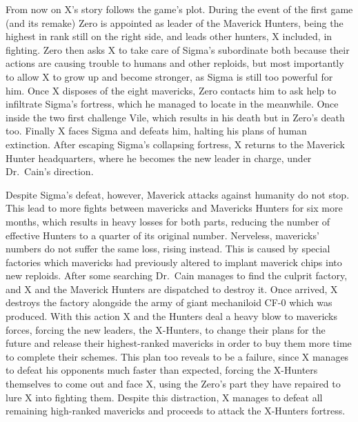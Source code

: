 From now on X's story follows the game's plot. During the event of the first game (and its remake) Zero is appointed as leader of the Maverick Hunters, being the highest in rank still on the right side, and leads other hunters, X included, in fighting. Zero then asks  X to take care of Sigma's subordinate both because their actions are causing trouble to humans and other reploids, but most importantly to allow X to grow up and become stronger, as Sigma is still too powerful for him. Once X disposes of the eight mavericks, Zero contacts him to ask help to infiltrate Sigma's fortress, which he managed to locate in the meanwhile. Once inside the two first challenge Vile, which results in his death but in Zero's death too. Finally X faces Sigma and defeats him, halting his plans of human extinction. After escaping Sigma's collapsing fortress, X returns to the Maverick Hunter headquarters, where he becomes the new leader in charge, under Dr.~Cain's direction.

Despite Sigma's defeat, however, Maverick attacks against humanity do not stop. This lead to more fights between mavericks and Mavericks Hunters for six more months, which results in heavy losses for both parts, reducing the number of effective Hunters to a quarter of its original number. Nerveless, mavericks' numbers do not suffer the same loss, rising instead. This is caused by special factories which mavericks had previously altered to implant maverick chips into new reploids. After some searching Dr.~Cain manages to find the culprit factory, and X and the Maverick Hunters are dispatched to destroy it. Once arrived, X destroys the factory alongside the army of giant mechaniloid CF-0 which was produced. With this action X and the Hunters deal a heavy blow to mavericks forces, forcing the new leaders, the X-Hunters, to change their plans for the future and release their highest-ranked mavericks in order to buy them more time to complete their schemes. This plan too reveals to be a failure, since X manages to defeat his opponents much faster than expected, forcing the X-Hunters themselves to come out and face X, using the Zero's part they have repaired to lure X into fighting them. Despite this distraction, X manages to defeat all remaining high-ranked mavericks and proceeds to attack the X-Hunters fortress. 

